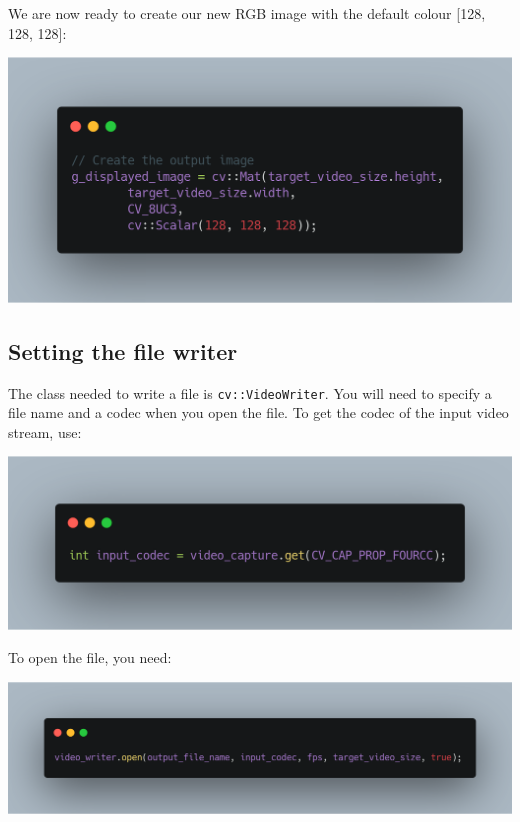 \documentclass[english,a4paper,12pt,oneside]{article}
\begin{document}
We are now ready to create our new RGB image with the default colour [128, 128, 128]:

\includegraphics[width=\linewidth]{carbon(5)}


\newpage
\subsection{Setting the file writer}
The class needed to write a file is \verb+cv::VideoWriter+. 
You will need to specify a file name and a codec when you open the file. 
To get the codec of the input video stream, use:

\includegraphics[width=\linewidth]{carbon(6)}

To open the file, you need:

\includegraphics[width=\linewidth]{carbon(7)}
\end{document}
